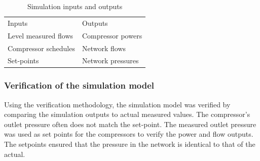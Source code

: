 \begin{table}[h!]
	\centering
	\begin{tabular}{ll}
		\hline 
		Inputs \hspace*{4cm} & Outputs \hspace*{4cm} \\ \hhline{==}
		Level measured flows & Compressor powers \\
		Compressor schedules & Network flows \\
		Set-points & Network pressures \\
		\hline
	\end{tabular}
		\caption{Simulation inputs and outputs}
\label{table: Mine B inputs/outputs}
\end{table}
	
	\subsubsection{Verification of the simulation model}
	Using the verification methodology, the simulation model was verified by comparing the simulation outputs to actual measured values. The compressor's outlet pressure often does not match the set-point. The measured outlet pressure was used as set points for the compressors to verify the power and flow outputs. The setpoints ensured that the pressure in the network is identical to that of the actual.
	\par 

